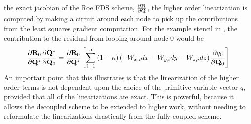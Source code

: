 the exact jacobian of the Roe FDS scheme, $\frac{\partial \mathbf R}{\partial \mathbf Q}$, the higher order
linearization is computed by making a circuit around each node to pick up the
contributions from the least squares gradient computation.  For the example
stencil in , the contribution to the residual from
looping around node 0 would be
\begin{equation}
  \frac{\partial \mathbf R_0}{\partial \mathbf Q^*}\frac{\partial \mathbf Q^*}{\partial \mathbf Q_0} = \frac{\partial \mathbf R_0}{\partial \mathbf Q^*} \left[\sum_{i=1}^5{(1-\kappa)
  \left( -W_{x,i}dx - W_{y,i}dy - W_{z,i}dz \right) \frac{\partial q_0}{\partial \mathbf Q_0}}\right]
  \label{ho-linearization}
\end{equation}
An important point that this illustrates is that the linearization of the higher
order terms is not dependent upon the choice of the primitive variable vector
$q$, provided that all of the linearizations are exact.  This is powerful,
because it allows the decoupled scheme to be extended to higher work, without
needing to reformulate the linearizations drastically from the fully-coupled
scheme.
